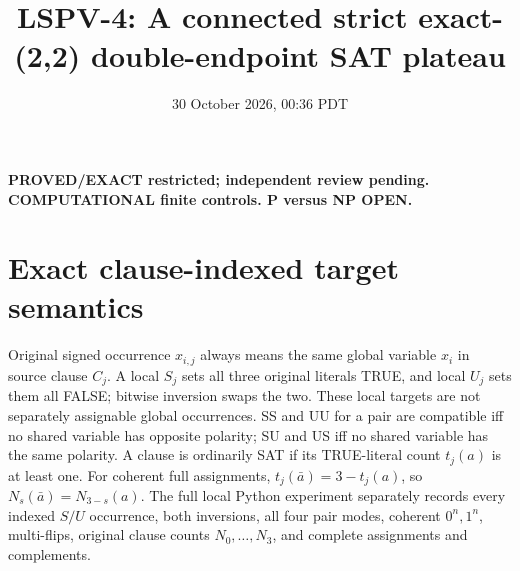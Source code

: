 \documentclass[11pt]{article}
\title{LSPV-4: A connected strict exact-(2,2) double-endpoint SAT plateau}
\date{30 October 2026, 00:36 PDT}
\begin{document}
\maketitle
\noindent\textbf{PROVED/EXACT restricted; independent review pending. COMPUTATIONAL finite controls. P versus NP OPEN.}
\section{Exact clause-indexed target semantics}
Original signed occurrence $x_{i,j}$ always means the same global variable $x_i$ in source clause $C_j$. A local $S_j$ sets all three original literals TRUE, and local $U_j$ sets them all FALSE; bitwise inversion swaps the two. These local targets are not separately assignable global occurrences. SS and UU for a pair are compatible iff no shared variable has opposite polarity; SU and US iff no shared variable has the same polarity. A clause is ordinarily SAT if its TRUE-literal count $t_j(a)$ is at least one. For coherent full assignments, $t_j(\bar a)=3-t_j(a)$, so $N_s(\bar a)=N_{3-s}(a)$. The full local Python experiment separately records every indexed $S/U$ occurrence, both inversions, all four pair modes, coherent $0^n,1^n$, multi-flips, original clause counts $N_0,\ldots,N_3$, and complete assignments and complements.
\end{document}
